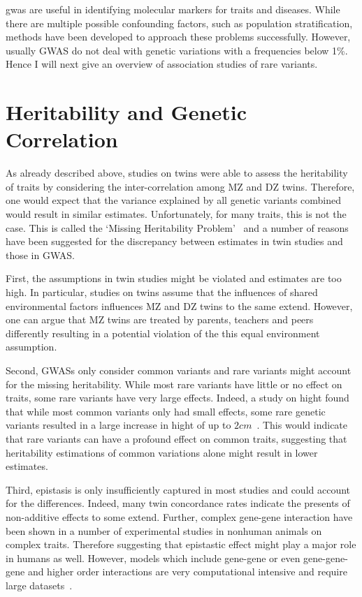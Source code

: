 \documentclass[../header.tex]{subfiles}
\begin{document}
\acrshort{gwas} are useful in identifying molecular markers for traits and diseases.
While there are multiple possible confounding factors, such as population stratification, methods have been developed to approach these problems successfully.
However, usually GWAS do not deal with genetic variations with a frequencies below 1\%.
Hence I will next give an overview of association studies of rare variants.

\section{Heritability and Genetic Correlation}
\label{sec:heritability_and_genetic_correlation}

As already described above, studies on twins were able to assess the heritability of traits by considering the inter-correlation among MZ and DZ twins.
Therefore, one would expect that the variance explained by all genetic variants combined would result in similar estimates.
Unfortunately, for many traits, this is not the case.
This is called the `Missing Heritability Problem'~\cite{Vineis2010} and a  number of reasons have been suggested for the discrepancy between estimates in twin studies and those in GWAS\@.

First, the assumptions in twin studies might be violated and estimates are too high.
In particular, studies on twins assume that the influences of shared environmental factors influences MZ and DZ twins to the same extend.
However, one can argue that MZ twins are treated by parents, teachers and peers differently resulting in a potential violation of the this equal environment assumption. 

Second, GWASs only consider common variants and rare variants might account for the missing heritability.
While most rare variants have little or no effect on traits, some rare variants have very large effects.
Indeed, a study on hight found that while most common variants only had small effects, some rare genetic variants resulted in a large increase in hight of up to $2cm$~\cite{Marouli2017}.
This would indicate that rare variants can have a profound effect on common traits, suggesting that heritability estimations of common variations alone might result in lower estimates.

Third, epistasis is only insufficiently captured in most studies and could account for the differences.
Indeed, many twin concordance rates indicate the presents of non-additive effects to some extend.
Further, complex gene-gene interaction have been shown in a number of experimental studies in nonhuman animals on complex traits.
Therefore suggesting that epistastic effect might play a major role in humans as well.
However, models which include gene-gene or even gene-gene-gene and higher order interactions are very computational intensive and require large datasets~\cite{Lippert2013}. 
\end{document}

